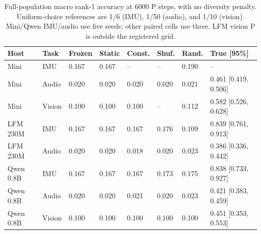 \begin{table}[!htbp]\centering\small
\setlength{\tabcolsep}{4pt}
\caption{Full-population macro rank-1 accuracy at 6000 P steps, with no diversity penalty. Uniform-choice references are 1/6 (IMU), 1/50 (audio), and 1/10 (vision). Mini/Qwen IMU/audio use five seeds; other paired cells use three. LFM vision P is outside the registered grid.}\label{tab:tasks}
\begin{tabular}{@{}llllllll@{}}
\toprule
Host & Task & Frozen & Static & Const. & Shuf. & Rand. & True [95\%] \\
\midrule
Mini & IMU & 0.167 & 0.167 & -- & -- & 0.190 & -- \\
Mini & Audio & 0.020 & 0.020 & 0.020 & 0.020 & 0.021 & 0.461 [0.419, 0.506] \\
Mini & Vision & 0.100 & 0.100 & 0.100 & -- & 0.112 & 0.582 [0.526, 0.628] \\
LFM 230M & IMU & 0.167 & 0.167 & 0.167 & 0.176 & 0.109 & 0.839 [0.761, 0.913] \\
LFM 230M & Audio & 0.020 & 0.020 & 0.018 & 0.020 & 0.023 & 0.386 [0.336, 0.442] \\
Qwen 0.8B & IMU & 0.167 & 0.167 & 0.167 & 0.173 & 0.175 & 0.838 [0.733, 0.927] \\
Qwen 0.8B & Audio & 0.020 & 0.020 & 0.021 & 0.020 & 0.023 & 0.421 [0.383, 0.459] \\
Qwen 0.8B & Vision & 0.100 & 0.100 & 0.100 & 0.100 & 0.100 & 0.451 [0.353, 0.553] \\
\bottomrule
\end{tabular}
\end{table}\par
